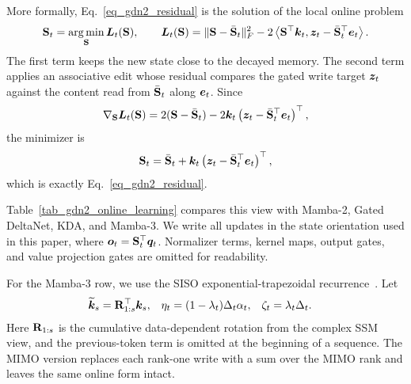\documentclass[10pt, logo, onecolumn, copyright]{nv}
\begin{document}
More formally, Eq.~\ref{eq_gdn2_residual} is the solution of the local online problem
\begin{align}
    {\mathbf{S}}_t
    =
    \operatorname*{arg\,min}_{{\mathbf{S}}}
    \boldsymbol{L}_t({\mathbf{S}}),
    \qquad
    \boldsymbol{L}_t({\mathbf{S}})
    =
    \|{\mathbf{S}}-\bar{{\mathbf{S}}}_t\|_F^2
    -
    2
    \left\langle
    {\mathbf{S}}^\top{\bm{k}}_t,
    {\bm{z}}_t-\bar{{\mathbf{S}}}_t^\top{\bm{e}}_t
    \right\rangle .
\label{eq_gdn2_online_objective}
\end{align}
The first term keeps the new state close to the decayed memory. The second term applies an associative edit whose residual compares the gated write target ${\bm{z}}_t$ against the content read from $\bar{{\mathbf{S}}}_t$ along ${\bm{e}}_t$. Since
\begin{align}
    \nabla_{{\mathbf{S}}}\boldsymbol{L}_t({\mathbf{S}})
    =
    2({\mathbf{S}}-\bar{{\mathbf{S}}}_t)
    -
    2{\bm{k}}_t
    \left(
    {\bm{z}}_t-\bar{{\mathbf{S}}}_t^\top{\bm{e}}_t
    \right)^\top ,
\end{align}
the minimizer is
\begin{align}
    {\mathbf{S}}_t
    =
    \bar{{\mathbf{S}}}_t
    +
    {\bm{k}}_t
    \left(
    {\bm{z}}_t-\bar{{\mathbf{S}}}_t^\top{\bm{e}}_t
    \right)^\top ,
\end{align}
which is exactly Eq.~\ref{eq_gdn2_residual}.

Table~\ref{tab_gdn2_online_learning} compares this view with Mamba-2, Gated DeltaNet, KDA, and Mamba-3. We write all updates in the state orientation used in this paper, where ${\bm{o}}_t={\mathbf{S}}_t^\top{\bm{q}}_t$. Normalizer terms, kernel maps, output gates, and value projection gates are omitted for readability.

For the Mamba-3 row, we use the SISO exponential-trapezoidal recurrence~\citep{lahoti2026mamba3}. Let
\begin{align}
    \widetilde{{\bm{k}}}_s &= {\mathbf{R}}_{1:s}^\top{\bm{k}}_s,
    &
    \eta_t &= (1-\lambda_t)\Delta_t\alpha_t,
    &
    \zeta_t &= \lambda_t\Delta_t .
\end{align}
Here ${\mathbf{R}}_{1:s}$ is the cumulative data-dependent rotation from the complex SSM view, and the previous-token term is omitted at the beginning of a sequence. The MIMO version replaces each rank-one write with a sum over the MIMO rank and leaves the same online form intact.
\end{document}
